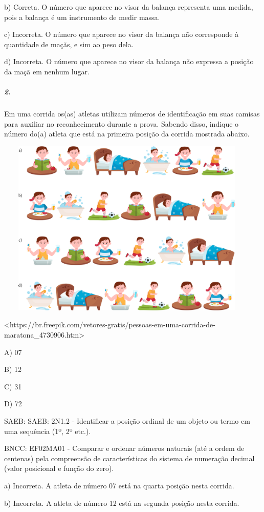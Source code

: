 b) Correta. O número que aparece no visor da balança representa uma
medida, pois a balança é um instrumento de medir massa.

c) Incorreta. O número que aparece no visor da balança não corresponde à
quantidade de maçãs, e sim ao peso dela.

d) Incorreta. O número que aparece no visor da balança não expressa a
posição da maçã em nenhum lugar.

\subparagraph{2. }\label{section-131}

Em uma corrida os(as) atletas utilizam números de identificação em suas
camisas para auxiliar no reconhecimento durante a prova. Sabendo disso,
indique o número do(a) atleta que está na primeira posição da corrida
mostrada abaixo.

\includegraphics[width=5.00000in,height=3.33333in]{media/image142.png}

\textless{}https://br.freepik.com/vetores-gratis/pessoas-em-uma-corrida-de-maratona\_4730906.htm\textgreater{}

A) 07

B) 12

C) 31

D) 72

SAEB: SAEB: 2N1.2 - Identificar a posição ordinal de um objeto ou termo
em uma sequência (1º, 2º etc.).

BNCC: EF02MA01 - Comparar e ordenar números naturais (até a ordem de
centenas) pela compreensão de características do sistema de numeração
decimal (valor posicional e função do zero).

a) Incorreta. A atleta de número 07 está na quarta posição nesta
corrida.

b) Incorreta. A atleta de número 12 está na segunda posição nesta
corrida.

